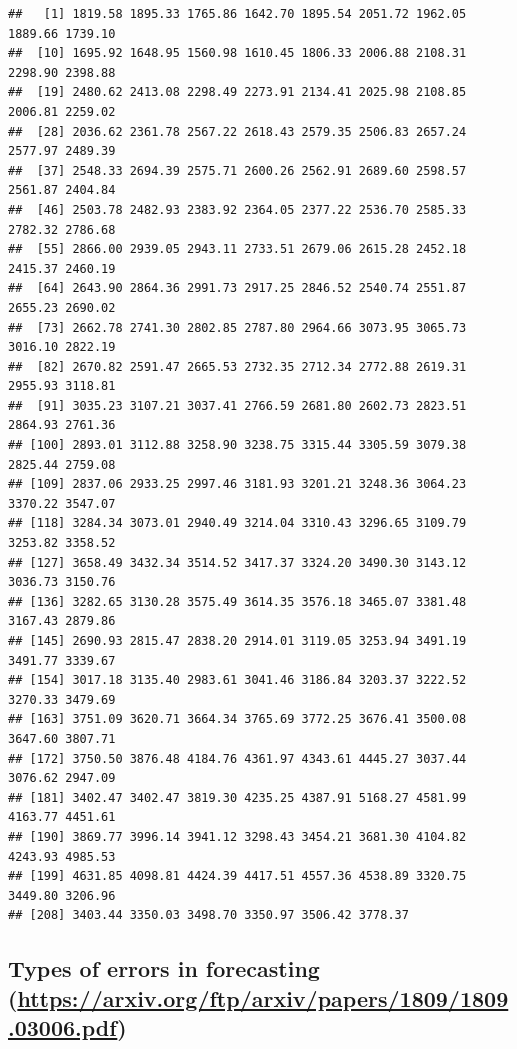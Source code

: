 \documentclass[
]{article}
\begin{document}
\begin{verbatim}
##   [1] 1819.58 1895.33 1765.86 1642.70 1895.54 2051.72 1962.05 1889.66 1739.10
##  [10] 1695.92 1648.95 1560.98 1610.45 1806.33 2006.88 2108.31 2298.90 2398.88
##  [19] 2480.62 2413.08 2298.49 2273.91 2134.41 2025.98 2108.85 2006.81 2259.02
##  [28] 2036.62 2361.78 2567.22 2618.43 2579.35 2506.83 2657.24 2577.97 2489.39
##  [37] 2548.33 2694.39 2575.71 2600.26 2562.91 2689.60 2598.57 2561.87 2404.84
##  [46] 2503.78 2482.93 2383.92 2364.05 2377.22 2536.70 2585.33 2782.32 2786.68
##  [55] 2866.00 2939.05 2943.11 2733.51 2679.06 2615.28 2452.18 2415.37 2460.19
##  [64] 2643.90 2864.36 2991.73 2917.25 2846.52 2540.74 2551.87 2655.23 2690.02
##  [73] 2662.78 2741.30 2802.85 2787.80 2964.66 3073.95 3065.73 3016.10 2822.19
##  [82] 2670.82 2591.47 2665.53 2732.35 2712.34 2772.88 2619.31 2955.93 3118.81
##  [91] 3035.23 3107.21 3037.41 2766.59 2681.80 2602.73 2823.51 2864.93 2761.36
## [100] 2893.01 3112.88 3258.90 3238.75 3315.44 3305.59 3079.38 2825.44 2759.08
## [109] 2837.06 2933.25 2997.46 3181.93 3201.21 3248.36 3064.23 3370.22 3547.07
## [118] 3284.34 3073.01 2940.49 3214.04 3310.43 3296.65 3109.79 3253.82 3358.52
## [127] 3658.49 3432.34 3514.52 3417.37 3324.20 3490.30 3143.12 3036.73 3150.76
## [136] 3282.65 3130.28 3575.49 3614.35 3576.18 3465.07 3381.48 3167.43 2879.86
## [145] 2690.93 2815.47 2838.20 2914.01 3119.05 3253.94 3491.19 3491.77 3339.67
## [154] 3017.18 3135.40 2983.61 3041.46 3186.84 3203.37 3222.52 3270.33 3479.69
## [163] 3751.09 3620.71 3664.34 3765.69 3772.25 3676.41 3500.08 3647.60 3807.71
## [172] 3750.50 3876.48 4184.76 4361.97 4343.61 4445.27 3037.44 3076.62 2947.09
## [181] 3402.47 3402.47 3819.30 4235.25 4387.91 5168.27 4581.99 4163.77 4451.61
## [190] 3869.77 3996.14 3941.12 3298.43 3454.21 3681.30 4104.82 4243.93 4985.53
## [199] 4631.85 4098.81 4424.39 4417.51 4557.36 4538.89 3320.75 3449.80 3206.96
## [208] 3403.44 3350.03 3498.70 3350.97 3506.42 3778.37
\end{verbatim}

\hypertarget{types-of-errors-in-forecasting-httpsarxiv.orgftparxivpapers18091809.03006.pdf}{%
\subsection{\texorpdfstring{Types of errors in forecasting
(\url{https://arxiv.org/ftp/arxiv/papers/1809/1809.03006.pdf})}{Types of errors in forecasting (https://arxiv.org/ftp/arxiv/papers/1809/1809.03006.pdf)}}\label{types-of-errors-in-forecasting-httpsarxiv.orgftparxivpapers18091809.03006.pdf}}
\end{document}
